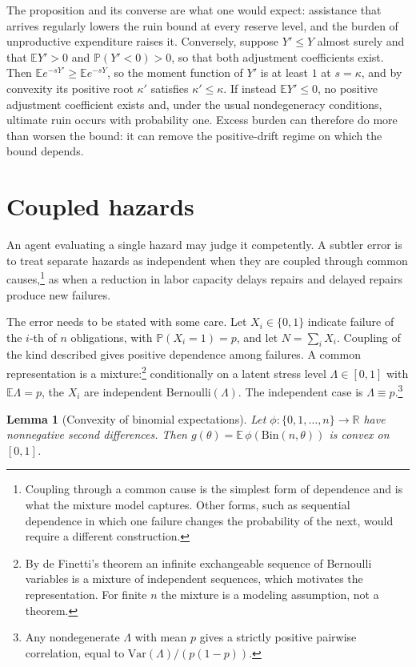 \documentclass[11pt]{article}
\newtheorem{lemma}{Lemma}
\theoremstyle{remark}
\newcommand{\R}{\mathbb{R}}
\newcommand{\E}{\mathbb{E}}
\renewcommand{\Pr}{\mathbb{P}}
\begin{document}
The proposition and its converse are what one would expect: assistance that arrives regularly lowers the ruin bound at every reserve level, and the burden of unproductive expenditure raises it. Conversely, suppose $Y'\le Y$ almost surely and that $\E Y'>0$ and $\Pr(Y'<0)>0$, so that both adjustment coefficients exist. Then $\E e^{-sY'}\ge\E e^{-sY}$, so the moment function of $Y'$ is at least $1$ at $s=\kappa$, and by convexity its positive root $\kappa'$ satisfies $\kappa'\le\kappa$. If instead $\E Y'\le0$, no positive adjustment coefficient exists and, under the usual nondegeneracy conditions, ultimate ruin occurs with probability one. Excess burden can therefore do more than worsen the bound: it can remove the positive-drift regime on which the bound depends.


\section{Coupled hazards}

An agent evaluating a single hazard may judge it competently. A subtler error is to treat separate hazards as independent when they are coupled through common causes,\footnote{Coupling through a common cause is the simplest form of dependence and is what the mixture model captures. Other forms, such as sequential dependence in which one failure changes the probability of the next, would require a different construction.} as when a reduction in labor capacity delays repairs and delayed repairs produce new failures.

The error needs to be stated with some care. Let $X_i\in\{0,1\}$ indicate failure of the $i$-th of $n$ obligations, with $\Pr(X_i=1)=p$, and let $N=\sum_iX_i$. Coupling of the kind described gives positive dependence among failures. A common representation is a mixture:\footnote{By de Finetti's theorem an infinite exchangeable sequence of Bernoulli variables is a mixture of independent sequences, which motivates the representation. For finite $n$ the mixture is a modeling assumption, not a theorem.} conditionally on a latent stress level $\Lambda\in[0,1]$ with $\E\Lambda=p$, the $X_i$ are independent Bernoulli$(\Lambda)$. The independent case is $\Lambda\equiv p$.\footnote{Any nondegenerate $\Lambda$ with mean $p$ gives a strictly positive pairwise correlation, equal to $\mathrm{Var}(\Lambda)/(p(1-p))$.}

\begin{lemma}[Convexity of binomial expectations]
Let $\phi:\{0,1,\dots,n\}\to\R$ have nonnegative second differences. Then $g(\theta)=\E\,\phi(\mathrm{Bin}(n,\theta))$ is convex on $[0,1]$.
\end{lemma}
\end{document}
